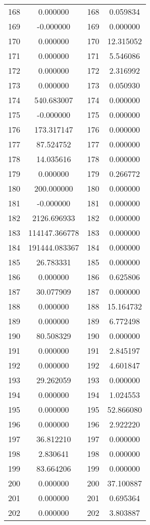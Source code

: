 \documentclass[12pt]{article}
\begin{document}
\begin{longtable}{@{}cccc@{}}
168 & 0.000000 & 168 & 0.059834 \\
169 & -0.000000 & 169 & 0.000000 \\
170 & 0.000000 & 170 & 12.315052 \\
171 & 0.000000 & 171 & 5.546086 \\
172 & 0.000000 & 172 & 2.316992 \\
173 & 0.000000 & 173 & 0.050930 \\
174 & 540.683007 & 174 & 0.000000 \\
175 & -0.000000 & 175 & 0.000000 \\
176 & 173.317147 & 176 & 0.000000 \\
177 & 87.524752 & 177 & 0.000000 \\
178 & 14.035616 & 178 & 0.000000 \\
179 & 0.000000 & 179 & 0.266772 \\
180 & 200.000000 & 180 & 0.000000 \\
181 & -0.000000 & 181 & 0.000000 \\
182 & 2126.696933 & 182 & 0.000000 \\
183 & 114147.366778 & 183 & 0.000000 \\
184 & 191444.083367 & 184 & 0.000000 \\
185 & 26.783331 & 185 & 0.000000 \\
186 & 0.000000 & 186 & 0.625806 \\
187 & 30.077909 & 187 & 0.000000 \\
188 & 0.000000 & 188 & 15.164732 \\
189 & 0.000000 & 189 & 6.772498 \\
190 & 80.508329 & 190 & 0.000000 \\
191 & 0.000000 & 191 & 2.845197 \\
192 & 0.000000 & 192 & 4.601847 \\
193 & 29.262059 & 193 & 0.000000 \\
194 & 0.000000 & 194 & 1.024553 \\
195 & 0.000000 & 195 & 52.866080 \\
196 & 0.000000 & 196 & 2.922220 \\
197 & 36.812210 & 197 & 0.000000 \\
198 & 2.830641 & 198 & 0.000000 \\
199 & 83.664206 & 199 & 0.000000 \\
200 & 0.000000 & 200 & 37.100887 \\
201 & 0.000000 & 201 & 0.695364 \\
202 & 0.000000 & 202 & 3.803887 \\

\end{longtable}
\end{document}
